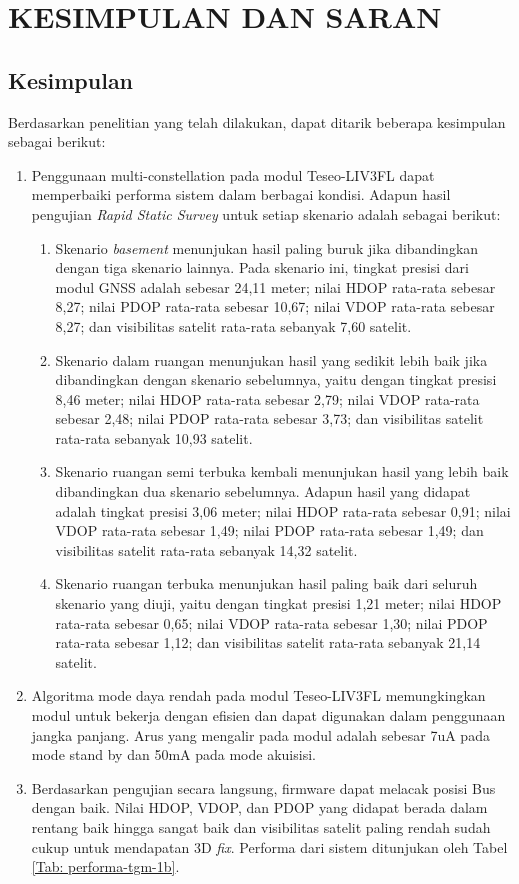 \chapter{KESIMPULAN DAN SARAN}

\section{Kesimpulan}
Berdasarkan penelitian yang telah dilakukan, dapat ditarik beberapa kesimpulan sebagai berikut:
\begin{enumerate}
	\item Penggunaan multi-constellation pada modul Teseo-LIV3FL dapat memperbaiki performa sistem dalam berbagai kondisi. Adapun hasil pengujian \textit{Rapid Static Survey} untuk setiap skenario adalah sebagai berikut:
	\begin{enumerate}
		\item Skenario \textit{basement} menunjukan hasil paling buruk jika dibandingkan dengan tiga skenario lainnya. Pada skenario ini, tingkat presisi dari modul GNSS adalah sebesar 24,11 meter; nilai HDOP rata-rata sebesar 8,27; nilai PDOP rata-rata sebesar 10,67; nilai VDOP rata-rata sebesar 8,27; dan visibilitas satelit rata-rata sebanyak 7,60 satelit.
		\item Skenario dalam ruangan menunjukan hasil yang sedikit lebih baik jika dibandingkan dengan skenario sebelumnya, yaitu dengan tingkat presisi 8,46 meter; nilai HDOP rata-rata sebesar 2,79; nilai VDOP rata-rata sebesar 2,48; nilai PDOP rata-rata sebesar 3,73; dan visibilitas satelit rata-rata sebanyak 10,93 satelit.
		\item Skenario ruangan semi terbuka kembali menunjukan hasil yang lebih baik dibandingkan dua skenario sebelumnya. Adapun hasil yang didapat adalah tingkat presisi 3,06 meter;  nilai HDOP rata-rata sebesar 0,91; nilai VDOP rata-rata sebesar 1,49; nilai PDOP rata-rata sebesar 1,49; dan visibilitas satelit rata-rata sebanyak 14,32 satelit.
		\item Skenario ruangan terbuka menunjukan hasil paling baik dari seluruh skenario yang diuji, yaitu dengan tingkat presisi 1,21 meter;  nilai HDOP rata-rata sebesar 0,65; nilai VDOP rata-rata sebesar 1,30; nilai PDOP rata-rata sebesar 1,12; dan visibilitas satelit rata-rata sebanyak 21,14 satelit.
	\end{enumerate}
	\item Algoritma mode daya rendah pada modul Teseo-LIV3FL memungkingkan modul untuk bekerja dengan efisien dan dapat digunakan dalam penggunaan jangka panjang. Arus yang mengalir pada modul adalah sebesar 7uA pada mode stand by dan 50mA pada mode akuisisi.
	\item Berdasarkan pengujian secara langsung, firmware dapat melacak posisi Bus dengan baik. Nilai HDOP, VDOP, dan PDOP yang didapat berada dalam rentang baik hingga sangat baik dan visibilitas satelit paling rendah sudah cukup untuk mendapatan 3D \textit{fix}.  Performa dari sistem ditunjukan oleh Tabel \ref{Tab: performa-tgm-1b}.
	

\end{enumerate}
